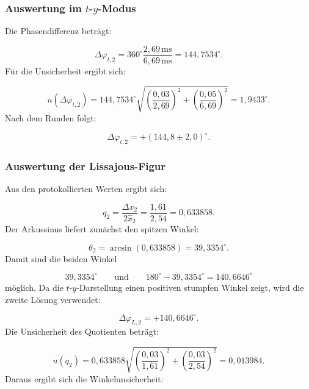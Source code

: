 \documentclass{report}
\begin{document}
\subsubsection{Auswertung im $t$-$y$-Modus}
\noindent
Die Phasendifferenz beträgt:

\begin{equation}
\Delta\varphi_{t,2}
=
360^\circ
\frac{2{,}69\,\mathrm{ms}}{6{,}69\,\mathrm{ms}}
=
144{,}7534^\circ.
\end{equation}
\noindent
Für die Unsicherheit ergibt sich:

\begin{equation}
u(\Delta\varphi_{t,2})
=
144{,}7534^\circ
\sqrt{
\left(\frac{0{,}03}{2{,}69}\right)^2
+
\left(\frac{0{,}05}{6{,}69}\right)^2
}
=
1{,}9433^\circ.
\end{equation}
\noindent
Nach dem Runden folgt:

\begin{equation}
\boxed{\Delta\varphi_{t,2}=+(144{,}8\pm2{,}0)^\circ}.
\label{eq:result_ty_2}
\end{equation}

\subsubsection{Auswertung der Lissajous-Figur}
\noindent
Aus den protokollierten Werten ergibt sich:

\begin{equation}
q_2
=
\frac{\Delta x_2}{2\hat{x}_2}
=
\frac{1{,}61}{2{,}54}
=
0{,}633858.
\end{equation}
\noindent
Der Arkussinus liefert zunächst den spitzen Winkel:

\begin{equation}
\theta_2
=
\arcsin(0{,}633858)
=
39{,}3354^\circ.
\end{equation}
\noindent
Damit sind die beiden Winkel

\begin{equation}
39{,}3354^\circ
\qquad\text{und}\qquad
180^\circ-39{,}3354^\circ
=
140{,}6646^\circ
\end{equation}
\noindent
möglich. Da die $t$-$y$-Darstellung einen positiven stumpfen Winkel zeigt, wird die zweite Lösung verwendet:

\begin{equation}
\Delta\varphi_{L,2}=+140{,}6646^\circ.
\end{equation}
\noindent
Die Unsicherheit des Quotienten beträgt:

\begin{equation}
u(q_2)
=
0{,}633858
\sqrt{
\left(\frac{0{,}03}{1{,}61}\right)^2
+
\left(\frac{0{,}03}{2{,}54}\right)^2
}
=
0{,}013984.
\end{equation}
\noindent
Daraus ergibt sich die Winkelunsicherheit:
\end{document}
